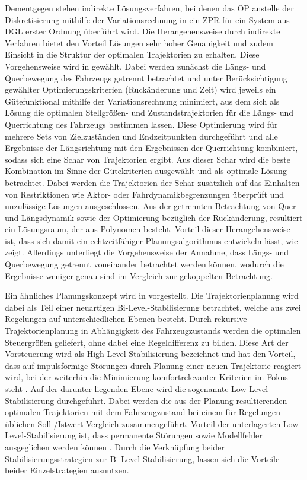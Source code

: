 Dementgegen stehen indirekte Lösungsverfahren, bei denen das \gls{OP} anstelle der Diskretisierung mithilfe der Variationsrechnung in ein \gls{ZPR} für ein System aus \gls{DGL} erster Ordnung überführt wird. Die Herangehensweise durch indirekte Verfahren bietet den Vorteil Lösungen sehr hoher Genauigkeit und zudem Einsicht in die Struktur der optimalen Trajektorien zu erhalten. Diese Vorgehensweise wird in \cite{Rathgeber.2016} gewählt. Dabei werden zunächst die Längs- und Querbewegung des Fahrzeugs getrennt betrachtet und unter Berücksichtigung gewählter Optimierungskriterien (Ruckänderung und Zeit) wird jeweils ein Gütefunktional mithilfe der Variationsrechnung minimiert, aus dem sich als Lösung die optimalen Stellgrößen- und Zustandstrajektorien für die Längs- und Querrichtung des Fahrzeugs bestimmen lassen. Diese Optimierung wird für mehrere Sets von Zielzuständen und Endzeitpunkten durchgeführt und alle Ergebnisse der Längsrichtung mit den Ergebnissen der Querrichtung kombiniert, sodass sich eine Schar von Trajektorien ergibt. Aus dieser Schar wird die beste Kombination im Sinne der Gütekriterien ausgewählt und als optimale Lösung betrachtet. Dabei werden die Trajektorien der Schar zusätzlich auf das Einhalten von Restriktionen wie Aktor- oder Fahrdynamikbegrenzungen überprüft und unzulässige Lösungen ausgeschlossen. Aus der getrennten Betrachtung von Quer- und Längsdynamik sowie der Optimierung bezüglich der Ruckänderung, resultiert ein Lösungsraum, der aus Polynomen besteht. Vorteil dieser Herangehensweise ist, dass sich damit ein echtzeitfähiger Planungsalgorithmus entwickeln lässt, wie \cite{Rathgeber.2016} zeigt. Allerdings unterliegt die Vorgehensweise der Annahme, dass Längs- und Querbewegung getrennt voneinander betrachtet werden können, wodurch die Ergebnisse weniger genau sind im Vergleich zur gekoppelten Betrachtung. 

Ein ähnliches Planungskonzept wird in \cite{Werling.2011} vorgestellt. Die Trajektorienplanung wird dabei als Teil einer neuartigen Bi-Level-Stabilisierung betrachtet, welche aus zwei Regelungen auf unterschiedlichen Ebenen besteht. Durch rekursive Trajektorienplanung in Abhängigkeit des Fahrzeugzustands werden die optimalen Steuergrößen geliefert, ohne dabei eine Regeldifferenz zu bilden. Diese Art der Vorsteuerung wird als High-Level-Stabilisierung bezeichnet und hat den Vorteil, dass auf impulsförmige Störungen durch Planung einer neuen Trajektorie reagiert wird, bei der weiterhin die Minimierung komfortrelevanter Kriterien im Fokus steht \cite{Werling.2011}. Auf der darunter liegenden Ebene wird die sogenannte Low-Level-Stabilisierung durchgeführt. Dabei werden die aus der Planung resultierenden optimalen Trajektorien mit dem Fahrzeugzustand bei einem für Regelungen üblichen Soll-/Istwert Vergleich zusammengeführt. Vorteil der unterlagerten Low-Level-Stabilisierung ist, dass permanente Störungen sowie Modellfehler ausgeglichen werden können \cite{Werling.2011}. Durch die Verknüpfung beider Stabilisierungsstrategien zur Bi-Level-Stabilisierung, lassen sich die Vorteile beider Einzelstrategien ausnutzen.   

